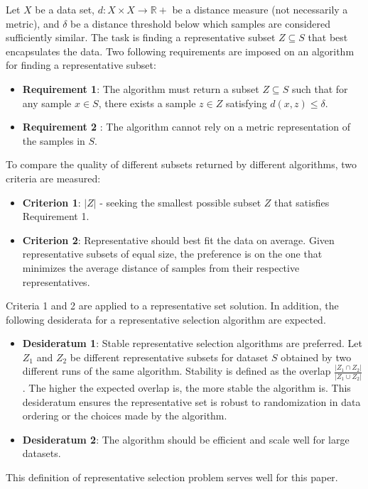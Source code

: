 \documentclass[thesis=B,english]{FITthesis}[2012/10/20]
\begin{document}
Let $X$ be a data set, $d \colon X \times X \to \mathbb{R} +$ be a distance measure (not necessarily a metric), and $\delta$ be a distance threshold below which samples are considered sufficiently similar.
The task is finding a representative subset $Z \subseteq S$ that best encapsulates the data.
Two following requirements are imposed on an algorithm for finding a representative subset:
\begin{itemize}
    \item \textbf{Requirement 1}: The algorithm must return a subset $Z \subseteq S$ such that for any sample $x \in S$, there exists a sample $z \in Z$ satisfying $d(x, z) \le \delta$.
    \item \textbf{Requirement 2} : The algorithm cannot rely on a metric representation of the samples in $S$.
\end{itemize}
To compare the quality of different subsets returned by different algorithms, two criteria are measured:
\begin{itemize}
    \item \textbf{Criterion 1}: $|Z|$ - seeking the smallest possible subset $Z$ that satisfies Requirement 1.
    \item \textbf{Criterion 2}: Representative should best fit the data on average. Given representative subsets of equal size, the preference is on the one that minimizes the average distance of samples from their respective representatives.
\end{itemize}
Criteria 1 and 2 are applied to a representative set solution.
In addition, the following desiderata for a representative selection algorithm are expected.
\begin{itemize}
    \item \textbf{Desideratum 1}: Stable representative selection algorithms are preferred. Let $Z_1$ and $Z_2$ be different representative subsets for dataset $S$ obtained by two different runs of the same algorithm.
Stability is defined as the overlap $\frac{|Z_1 \cap Z_2|}{|Z_1 \cup Z_2|}$.
The higher the expected overlap is, the more stable the algorithm is.
This desideratum ensures the representative set is robust to randomization in data ordering or the choices made by the algorithm.
    \item \textbf{Desideratum 2}: The algorithm should be efficient and scale
well for large datasets.
\end{itemize}

This definition of representative selection problem serves well for this paper.
\end{document}
